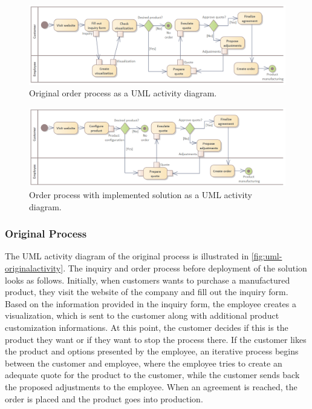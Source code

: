 \begin{landscape}
\begin{figure}[h!]
\centering
\includegraphics[width=0.78\linewidth]{images/uml_originalactivity.png}
\caption{Original order process as a UML activity diagram.}
\label{fig:uml-originalactivity}
\end{figure}
\begin{figure}[h!]
\centering
\includegraphics[width=0.78\linewidth]{images/uml_newactivity.png}
\caption{Order process with implemented solution as a UML activity diagram.}
\label{fig:uml-newactivity}
\end{figure}
\end{landscape}


\subsubsection{Original Process}


The UML activity diagram of the original process is illustrated in \autoref{fig:uml-originalactivity}. The inquiry and order process before deployment of the solution looks as follows. Initially, when customers wants to purchase a manufactured product, they visit the website of the company and fill out the inquiry form. Based on the information provided in the inquiry form, the employee creates a visualization, which is sent to the customer along with additional product customization informations. At this point, the customer decides if this is the product they want or if they want to stop the process there. If the customer likes the product and options presented by the employee, an iterative process begins between the customer and employee, where the employee tries to create an adequate quote for the product to the customer, while the customer sends back the proposed adjustments to the employee. When an agreement is reached, the order is placed and the product goes into production. 



